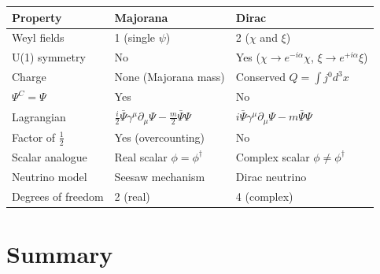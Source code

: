 \begin{center}
\renewcommand{\arraystretch}{1.5}
\begin{tabular}{@{}lll@{}}
  \toprule
  \textbf{Property} & \textbf{Majorana} & \textbf{Dirac} \\
  \midrule
  Weyl fields & 1 (single $\psi$) & 2 ($\chi$ and $\xi$) \\
  U(1) symmetry & No & Yes ($\chi\to e^{-i\alpha}\chi$, $\xi\to e^{+i\alpha}\xi$) \\
  Charge & None (Majorana mass) & Conserved $Q=\int j^0 d^3x$ \\
  $\Psi^C = \Psi$ & Yes & No \\
  Lagrangian & $\frac{i}{2}\bar{\Psi}\gamma^\mu\partial_\mu\Psi - \frac{m}{2}\bar{\Psi}\Psi$ &
               $i\bar{\Psi}\gamma^\mu\partial_\mu\Psi - m\bar{\Psi}\Psi$ \\
  Factor of $\frac{1}{2}$ & Yes (overcounting) & No \\
  Scalar analogue & Real scalar $\phi=\phi^\dagger$ & Complex scalar $\phi\neq\phi^\dagger$ \\
  Neutrino model & Seesaw mechanism & Dirac neutrino \\
  Degrees of freedom & 2 (real) & 4 (complex) \\
  \bottomrule
\end{tabular}
\end{center}

\section{Summary}

